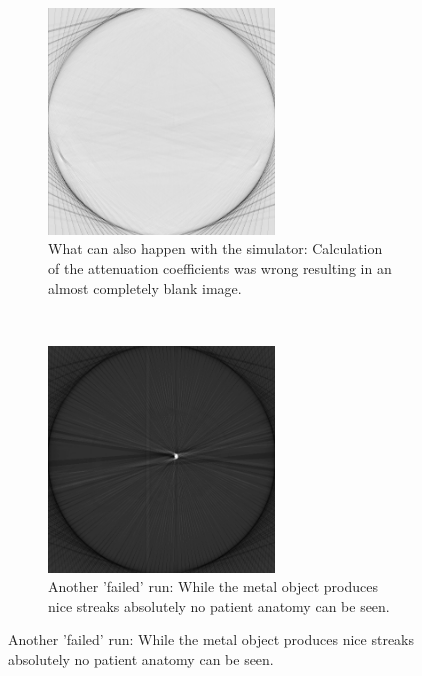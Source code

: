 \begin{figure}[h]
	\centering		
	\begin{subfigure}[h]{0.45\textwidth}
		\centering
		\includegraphics[height=6cm]{images/sim07.png}
		\caption{What can also happen with the simulator: Calculation of the attenuation coefficients was wrong resulting in an almost completely blank image.}
		\label{sim07}
	\end{subfigure}%
	~
	\begin{subfigure}[h]{0.45\textwidth}
		\centering
		\includegraphics[height=6cm]{images/sim08.png}
		\caption{Another 'failed' run: While the metal object produces nice streaks absolutely no patient anatomy can be seen.\\}
		\label{sim08}
	\end{subfigure}%
\end{figure}
